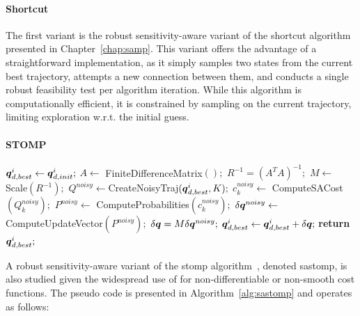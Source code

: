 \paragraph{Shortcut}

The first variant is the robust sensitivity-aware variant of the shortcut algorithm~\cite{cShortcut} presented in Chapter~\ref{chap:samp}.
This variant offers the advantage of a straightforward implementation, as it simply samples two states from the current best trajectory, attempts a new connection between them, and conducts a single robust feasibility test per algorithm iteration.
While this algorithm is computationally efficient, it is constrained by sampling on the current trajectory, limiting exploration w.r.t. the initial guess.

\paragraph{STOMP}

\begin{algorithm}[h!]
    \caption{ [$\q_{d,init}^{i}, K$]}\label{alg:sastomp}
    \begin{algorithmic}[1]
    \State $\boldsymbol{q}_{d,best}^{i} \gets \boldsymbol{q}_{d,init}^{i};$
    \State $A \gets$ FiniteDifferenceMatrix$();$
    \State $R^{-1} = (A^TA)^{-1};$
    \State $M \gets$ Scale$(R^{-1});$
        \State $Q^{noisy} \gets $CreateNoisyTraj$(\boldsymbol{q}_{d,best}^{i}, K);$
            \State $c_k^{noisy} \gets$ ComputeSACost$(Q_k^{noisy});$
            \State $P^{noisy} \gets $ ComputeProbabilities$(c_k^{noisy});$
        \EndFor
        \State $\delta \boldsymbol{q}^{noisy} \gets$ ComputeUpdateVector$(P^{noisy});$
        \State $\delta \boldsymbol{q} = M \delta \boldsymbol{q}^{noisy};$
        \State $\boldsymbol{q}_{d,best}^{i} \gets \boldsymbol{q}_{d,best}^{i} + \delta \boldsymbol{q};$
    \EndWhile
    \State \textbf{return} $\boldsymbol{q}_{d,best}^{i};$
    \end{algorithmic}
\end{algorithm}

A robust sensitivity-aware variant of the \gls{stomp} algorithm~\cite{cSTOMP}, denoted \gls{sastomp}, is also studied given the widespread use of  for non-differentiable or non-smooth cost functions.
The pseudo code is presented in Algorithm~\ref{alg:sastomp} and operates as follows:

